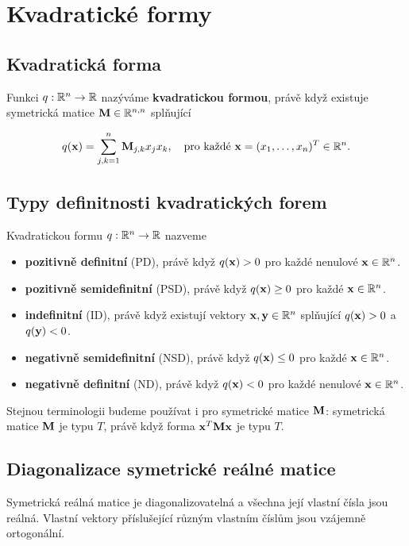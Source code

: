 \section{Kvadratické formy}

\subsection*{Kvadratická forma}

Funkci $q: \mathbb{R}^n \to \mathbb{R}$ nazýváme \textbf{kvadratickou formou}, právě když
existuje symetrická matice $\mathbf{M} \in \mathbb{R}^{n,n}$ splňující

\[ q(\mathbf{x}) = \sum_{j,k=1}^n \mathbf{M}_{j,k} x_j x_k, \quad \text{pro každé} \ \mathbf{x} = (x_1,\ldots,x_n)^T \in \mathbb{R}^n. \]

\subsection*{Typy definitnosti kvadratických forem}

Kvadratickou formu $q: \mathbb{R}^n \to \mathbb{R}$ nazveme

\begin{itemize}
    \item \textbf{pozitivně definitní} (PD), právě když $q(\mathbf{x}) > 0$ pro každé nenulové $\mathbf{x} \in \mathbb{R}^n$.
    \item \textbf{pozitivně semidefinitní} (PSD), právě když $q(\mathbf{x}) \geq 0$ pro každé $\mathbf{x}\in\mathbb{R}^n$.
    \item \textbf{indefinitní} (ID), právě když existují vektory $\mathbf{x},\mathbf{y}\in\mathbb{R}^n$ splňující $q(\mathbf{x}) > 0$ a $q(\mathbf{y}) < 0$.
    \item \textbf{negativně semidefinitní} (NSD), právě když $q(\mathbf{x}) \leq 0$ pro každé $\mathbf{x}\in\mathbb{R}^n$.
    \item \textbf{negativně definitní} (ND), právě když $q(\mathbf{x}) < 0$ pro každé nenulové $\mathbf{x} \in \mathbb{R}^n$.
\end{itemize}

\noindent Stejnou terminologii budeme používat i pro symetrické matice $\mathbf{M}$: symetrická
matice $\mathbf{M}$ je typu $T$, právě když forma $\mathbf{x}^T \mathbf{M} \mathbf{x}$ je typu $T$.

\subsection*{Diagonalizace symetrické reálné matice}

Symetrická reálná matice je diagonalizovatelná a všechna její vlastní čísla
jsou reálná. Vlastní vektory příslušející různým vlastním číslům jsou vzájemně
ortogonální.

